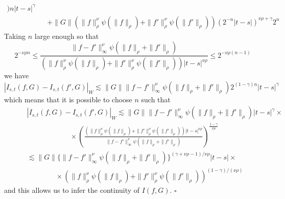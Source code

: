 \documentclass[a4paper,11pt]{article}
\newenvironment{proof}{{\sc Proof.}}{\hfill$\square$}
\begin{document}
\begin{proof}
\begin{eqnarray*}
{    ) n}  |t-s|^{\gamma}\\
    &  & + \|G\| ( \| f \|^{\nu}_{\rho} \psi ( \| f \|_{\rho} ) + \| f'
    \|^{\nu}_{\rho} \psi ( \| f' \|_{\rho} ) )  ( 2^{-n} |t-s| )^{\nu \rho +
    \gamma} 2^{n}
  \end{eqnarray*}
  Taking $n$ large enough so that
  \[ 2^{- \nu \rho n} \leqslant \frac{\|f-f' \|^{\nu}_{\infty} \psi ( \| f
     \|_{\rho} + \| f' \|_{\rho} )}{( \| f \|^{\nu}_{\rho} \psi ( \| f
     \|_{\rho} ) + \| f' \|^{\nu}_{\rho} \psi ( \| f' \|_{\rho} ) ) |t-s|^{\nu
     \rho}} \leqslant 2^{- \nu \rho ( n-1 )} \]
  we have
  \[ |I_{s,t} (f,G)-I_{s,t} (f' ,G)|_{W} \lesssim \|G\|  \|f-f'
     \|^{\nu}_{\infty} \psi ( \| f \|_{\rho} + \| f' \|_{\rho} ) 2^{(1- \gamma
     ) n}  |t-s|^{\gamma} \]
  which means that it is possible to choose $n$ such that
  \begin{equation*}\begin{split} & |I_{s,t} (f,G)-I_{s,t} (f' ,G)|_{W}   \lesssim \|G\|  \|f-f'
     \|^{\nu}_{\infty} \psi ( \| f \|_{\rho} + \| f' \|_{\rho} ) 
     |t-s|^{\gamma} \times \\  & \qquad \qquad \qquad  \times \left( \frac{( \| f \|^{\nu}_{\rho} \psi ( \| f \|_{\rho}
     ) + \| f' \|^{\nu}_{\rho} \psi ( \| f' \|_{\rho} ) )|t-s|^{\nu \rho}
     }{\|f-f' \|^{\nu}_{\infty} \psi ( \| f \|_{\rho} + \| f' \|_{\rho} )}
     \right)^{\frac{1- \gamma}{\nu \rho}}
     \\  \qquad & \lesssim \|G\| \{ \|f-f' \|^{\nu}_{\infty} \psi ( \| f \|_{\rho} + \| f'
     \|_{\rho} ) \}^{( \gamma + \nu \rho -1 ) / \nu \rho}  |t-s| \times \\ & \qquad \qquad \times ( \| f
     \|^{\nu}_{\rho} \psi ( \| f \|_{\rho} ) + \| f' \|^{\nu}_{\rho} \psi ( \|
     f' \|_{\rho} ) )^{(1- \gamma ) / ( \nu \rho )} 
     \end{split}\end{equation*}
  and this allows us to infer the continuity of $I ( f,G )$.
\end{proof}
\end{document}
